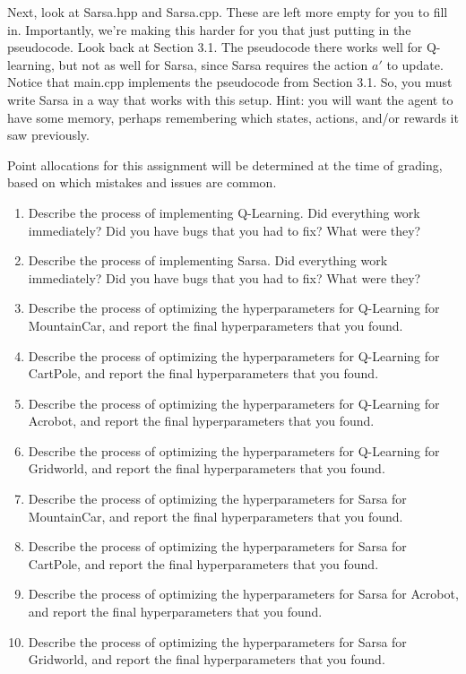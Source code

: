 \documentclass[]{article}
\begin{document}
Next, look at Sarsa.hpp and Sarsa.cpp. These are left more empty for you to fill in. Importantly, we're making this harder for you that just putting in the pseudocode. Look back at Section 3.1. The pseudocode there works well for Q-learning, but not as well for Sarsa, since Sarsa requires the action $a'$ to update. Notice that main.cpp implements the pseudocode from Section 3.1. So, you must write Sarsa in a way that works with this setup. Hint: you will want the agent to have some memory, perhaps remembering which states, actions, and/or rewards it saw previously.

Point allocations for this assignment will be determined at the time of grading, based on which mistakes and issues are common.

\begin{enumerate}
    \item Describe the process of implementing Q-Learning. Did everything work immediately? Did you have bugs that you had to fix? What were they?
    \item Describe the process of implementing Sarsa. Did everything work immediately? Did you have bugs that you had to fix? What were they?
    \item Describe the process of optimizing the hyperparameters for Q-Learning for MountainCar, and report the final hyperparameters that you found.
    \item Describe the process of optimizing the hyperparameters for Q-Learning for CartPole, and report the final hyperparameters that you found.
    \item Describe the process of optimizing the hyperparameters for Q-Learning for Acrobot, and report the final hyperparameters that you found.
    \item Describe the process of optimizing the hyperparameters for Q-Learning for Gridworld, and report the final hyperparameters that you found.
    \item Describe the process of optimizing the hyperparameters for Sarsa for MountainCar, and report the final hyperparameters that you found.
    \item Describe the process of optimizing the hyperparameters for Sarsa for CartPole, and report the final hyperparameters that you found.
    \item Describe the process of optimizing the hyperparameters for Sarsa for Acrobot, and report the final hyperparameters that you found.
    \item Describe the process of optimizing the hyperparameters for Sarsa for Gridworld, and report the final hyperparameters that you found.

\end{enumerate}
\end{document}
